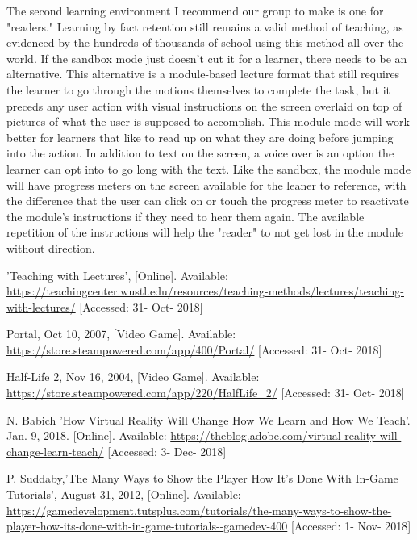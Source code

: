 \documentclass[onecolumn, draftclsnofoot,10pt, compsoc]{IEEEtran}
\begin{document}
The second learning environment I recommend our group to make is one for "readers." Learning by fact retention still remains a valid method of teaching, as evidenced by the hundreds of thousands of school using this method all over the world. If the sandbox mode just doesn't cut it for a learner, there needs to be an alternative. This alternative is a module-based lecture format that still requires the learner to go through the motions themselves to complete the task, but it preceds any user action with visual instructions on the screen overlaid on top of pictures of what the user is supposed to accomplish. This module mode will work better for learners that like to read up on what they are doing before jumping into the action. In addition to text on the screen, a voice over is an option the learner can opt into to go long with the text. Like the sandbox, the module mode will have progress meters on the screen available for the leaner to reference, with the difference that the user can click on or touch the progress meter to reactivate the module's instructions if they need to hear them again. The available repetition of the instructions will help the "reader" to not get lost in the module without direction.




\begin{thebibliography}{00}
 'Teaching with Lectures', [Online]. Available: \url{https://teachingcenter.wustl.edu/resources/teaching-methods/lectures/teaching-with-lectures/} [Accessed: 31- Oct- 2018]

 Portal, Oct 10, 2007, [Video Game]. Available: \url{https://store.steampowered.com/app/400/Portal/} [Accessed: 31- Oct- 2018]

 Half-Life 2, Nov 16, 2004, [Video Game]. Available: \url{https://store.steampowered.com/app/220/HalfLife\_2/} [Accessed: 31- Oct- 2018]

 N. Babich 'How Virtual Reality Will Change How We Learn and How We Teach'. Jan. 9, 2018. [Online]. Available: \url{https://theblog.adobe.com/virtual-reality-will-change-learn-teach/} [Accessed: 3- Dec- 2018]

 P. Suddaby,'The Many Ways to Show the Player How It's Done With In-Game Tutorials', August 31, 2012, [Online]. Available: \url{https://gamedevelopment.tutsplus.com/tutorials/the-many-ways-to-show-the-player-how-its-done-with-in-game-tutorials--gamedev-400} [Accessed: 1- Nov- 2018]


\end{thebibliography}
\end{document}
